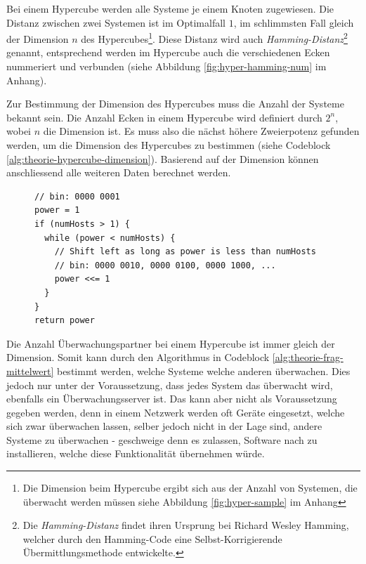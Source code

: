 Bei einem Hypercube werden alle Systeme je einem Knoten zugewiesen. Die Distanz zwischen zwei Systemen ist im Optimalfall $1$, im schlimmsten Fall gleich der Dimension $n$ des Hypercubes\footnote{\label{foot:hypercube-dimension}Die Dimension beim Hypercube ergibt sich aus der Anzahl von Systemen, die \"uberwacht werden m\"ussen siehe Abbildung \ref{fig:hyper-sample} im Anhang}. Diese Distanz wird auch \textit{Hamming-Distanz}\footnote{\label{foot:hypercube-hamming}Die \textit{Hamming-Distanz} findet ihren Ursprung bei Richard Wesley Hamming, welcher durch den Hamming-Code eine Selbst-Korrigierende \"Ubermittlungsmethode entwickelte.} genannt, entsprechend werden im Hypercube auch die verschiedenen Ecken nummeriert und verbunden (siehe Abbildung \ref{fig:hyper-hamming-num} im Anhang).

Zur Bestimmung der Dimension des Hypercubes muss die Anzahl der Systeme bekannt sein. Die Anzahl Ecken in einem Hypercube wird definiert durch $2^n$, wobei $n$ die Dimension ist. Es muss also die n\"achst h\"ohere Zweierpotenz gefunden werden, um die Dimension des Hypercubes zu bestimmen (siehe Codeblock \ref{alg:theorie-hypercube-dimension}). Basierend auf der Dimension k\"onnen anschliessend alle weiteren Daten berechnet werden.

\begin{figure}[H]
 \lstset{language=[ANSI]C}
 \begin{lstlisting}[label=alg:theorie-hypercube-dimension,caption={[N\"achst h\"ohere Zweierpotenz finden]Algorithmus zum Auffinden der n\"achst h\"oheren Zweierpotenz zur Dimensionsbestimmung eines Hypercubes anhand der Anzahl Systeme. Die Schlaufe "`schiebt"' dabei die 1 in der bin\"aren Darstellung so lange nach links bis die Potenz gr\"osser oder gleich der Anzahl Systeme ist.}]
// bin: 0000 0001
power = 1
if (numHosts > 1) {
  while (power < numHosts) {
    // Shift left as long as power is less than numHosts
    // bin: 0000 0010, 0000 0100, 0000 1000, ...
    power <<= 1
  }
}
return power
 \end{lstlisting}
\end{figure}

Die Anzahl \"Uberwachungspartner bei einem Hypercube ist immer gleich der Dimension. Somit kann durch den Algorithmus in Codeblock \ref{alg:theorie-frag-mittelwert} bestimmt werden, welche Systeme welche anderen \"uberwachen. Dies jedoch nur unter der Voraussetzung, dass jedes System das \"uberwacht wird, ebenfalls ein \"Uberwachungsserver ist. Das kann aber nicht als Voraussetzung gegeben werden, denn in einem Netzwerk werden oft Ger\"ate eingesetzt, welche sich zwar \"uberwachen lassen, selber jedoch nicht in der Lage sind, andere Systeme zu \"uberwachen - geschweige denn es zulassen, Software nach zu installieren, welche diese Funktionalit\"at \"ubernehmen w\"urde.

